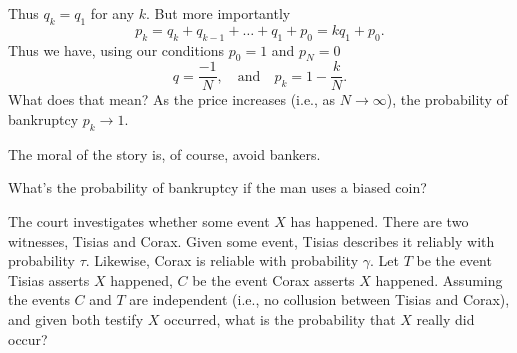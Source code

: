 Thus $q_{k}=q_{1}$ for any $k$. But more importantly
\begin{equation}
p_{k}=q_{k}+q_{k-1}+\dots+q_{1}+p_{0}=kq_{1}+p_{0}.
\end{equation}
Thus we have, using our conditions $p_0=1$ and $p_N=0$
\begin{equation}
q=\frac{-1}{N},\quad\mbox{and}\quad
p_{k}=1-\frac{k}{N}.
\end{equation}
What does that mean? As the price increases (i.e., as $N\to\infty$), the
probability of bankruptcy $p_{k}\to1$.

The moral of the story is, of course, avoid bankers.

 What's the probability of bankruptcy if the man uses a
biased coin? 


The court investigates whether some event $X$ has happened. There are
two witnesses, Tisias and Corax. Given some event, Tisias describes it
reliably with probability $\tau$. Likewise, Corax is reliable with
probability $\gamma$. Let $T$ be the event Tisias asserts $X$ happened,
$C$ be the event Corax asserts $X$ happened. Assuming the events $C$ and
$T$ are independent (i.e., no collusion between Tisias and Corax), and
given both testify $X$ occurred, what is the probability that $X$ really
did occur?

